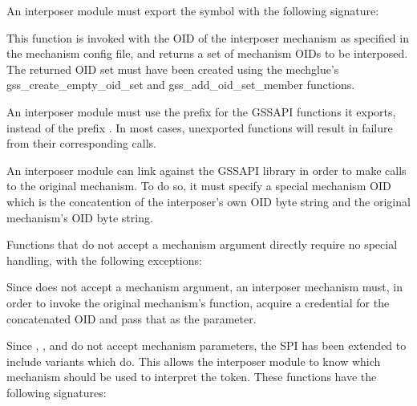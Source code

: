 \documentclass[letterpaper,10pt,english]{sphinxmanual}
\begin{document}
\sphinxAtStartPar
An interposer module must export the symbol 
with the following signature:

\begin{sphinxVerbatim}[commandchars=\\\{\}]
  
\end{sphinxVerbatim}

\sphinxAtStartPar
This function is invoked with the OID of the interposer mechanism as
specified in the mechanism config file, and returns a set of mechanism
OIDs to be interposed.  The returned OID set must have been created
using the mechglue’s gss\_create\_empty\_oid\_set and
gss\_add\_oid\_set\_member functions.

\sphinxAtStartPar
An interposer module must use the prefix  for the GSSAPI
functions it exports, instead of the prefix .  In most cases,
unexported  functions will result in failure from their
corresponding  calls.

\sphinxAtStartPar
An interposer module can link against the GSSAPI library in order to
make calls to the original mechanism.  To do so, it must specify a
special mechanism OID which is the concatention of the interposer’s
own OID byte string and the original mechanism’s OID byte string.

\sphinxAtStartPar
Functions that do not accept a mechanism argument directly require no
special handling, with the following exceptions:

\sphinxAtStartPar
Since  does not accept a mechanism argument,
an interposer mechanism must, in order to invoke the original
mechanism’s function, acquire a credential for the concatenated OID
and pass that as the  parameter.

\sphinxAtStartPar
Since , , and
 do not accept mechanism parameters, the SPI
has been extended to include variants which do.  This allows the
interposer module to know which mechanism should be used to interpret
the token.  These functions have the following signatures:
\end{document}
